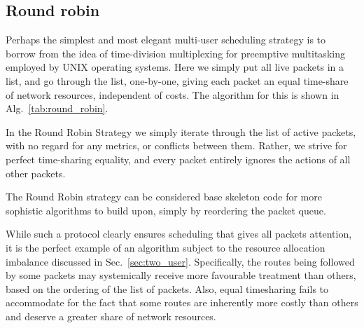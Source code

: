 \documentclass[aps,rmp,twocolumn,amsmath,amssymb,nofootinbib,superscriptaddress]{revtex4}
\begin{document}
\subsection{Round robin} \label{sec:round_robin}

Perhaps the simplest and most elegant multi-user scheduling strategy is to borrow from the idea of time-division multiplexing for preemptive multitasking employed by UNIX operating systems. Here we simply put all live packets in a list, and go through the list, one-by-one, giving each packet an equal time-share of network resources, independent of costs. The algorithm for this is shown in Alg.~\ref{tab:round_robin}.

\begin{table}[!htb]
\caption{In the {\sc Round Robin Strategy} we simply iterate through the list of active packets, with no regard for any metrics, or conflicts between them. Rather, we strive for perfect time-sharing equality, and every packet entirely ignores the actions of all other packets.} \label{tab:round_robin}
\end{table}
The {\sc Round Robin} strategy can be considered base skeleton code for more sophistic algorithms to build upon, simply by reordering the packet queue.

While such a protocol clearly ensures scheduling that gives all packets attention, it is the perfect example of an algorithm subject to the resource allocation imbalance discussed in Sec.~\ref{sec:two_user}. Specifically, the routes being followed by some packets may systemically receive more favourable treatment than others, based on the ordering of the list of packets. Also, equal timesharing fails to accommodate for the fact that some routes are inherently more costly than others and deserve a greater share of network resources.
\end{document}
